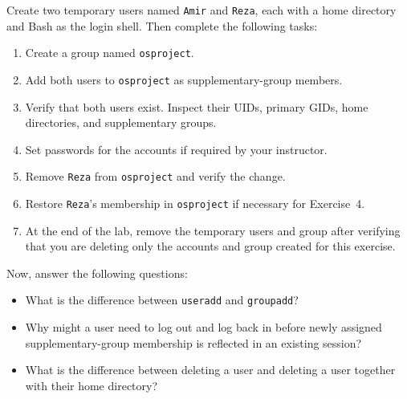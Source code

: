 Create two temporary users named \texttt{Amir} and \texttt{Reza}, each with a home directory and Bash as the login shell. Then complete the following tasks:
\begin{enumerate}
	\item Create a group named \texttt{osproject}.
	\item Add both users to \texttt{osproject} as supplementary-group members.
	\item Verify that both users exist. Inspect their UIDs, primary GIDs, home directories, and supplementary groups.
	\item Set passwords for the accounts if required by your instructor.
	\item Remove \texttt{Reza} from \texttt{osproject} and verify the change.
	\item Restore \texttt{Reza}'s membership in \texttt{osproject} if necessary for Exercise~4.
	\item At the end of the lab, remove the temporary users and group after verifying that you are deleting only the accounts and group created for this exercise.
\end{enumerate}
Now, answer the following questions:
\begin{itemize}
	\item What is the difference between \texttt{useradd} and \texttt{groupadd}?
	\item Why might a user need to log out and log back in before newly assigned supplementary-group membership is reflected in an existing session?
	\item What is the difference between deleting a user and deleting a user together with their home directory?
\end{itemize}

